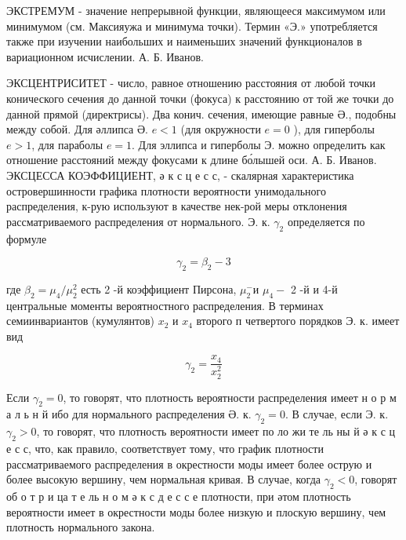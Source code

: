 \documentclass[10pt]{article}
\begin{document}
ЭКСТРЕМУМ - значение непрерывной функции, являющееся максимумом или минимумом (см. Максияужа и минимума точки). Термин «Э.» употребляется также при изучении наибольших и наименьших значений функционалов в вариационном исчислении. А. Б. Иванов.



ЭКСЦЕНТРИСИТЕТ - число, равное отношению расстояния от любой точки конического сечения до данной точки (фокуса) к расстоянию от той же точки до данной прямой (директрисы). Два конич. сечения, имеющие равные Ә., подобны между собой. Для әллипса Ә. $e<1$ (для окружности $e=0$ ), для гиперболы $e>1$, для параболы $e=1$. Для эллипса и гиперболы Э. можно определить как отношение расстояний между фокусами к длине бо́лышей оси. $А$. Б. Иванов. ЭКСЦЕССА КОЭФФИЦИЕНТ, ә к с ц е с с, - скалярная характеристика островершинности графика плотности вероятности унимодального распределения, к-рую используют в качестве нек-рой меры отклонения рассматриваемого распределения от нормального. Э. к. $\gamma_{2}$ определяется по формуле



\[

\gamma_{2}=\beta_{2}-3

\]



где $\beta_{2}=\mu_{4} / \mu_{2}^{2}$ есть 2 -й коэффициент Пирсона, $\mu_{2}^{-}$и $\mu_{4}-$ 2 -й и 4-й центральные моменты вероятностного распределения. В терминах семиинвариантов (кумулянтов) $x_{2}$ и $x_{4}$ второго п четвертого порядков Э. к. имеет вид



\[

\gamma_{2}=\frac{x_{4}}{x_{2}^{2}}

\]



Если $\gamma_{2}=0$, то говорят, что плотность вероятности распределения имеет н о р м а л ь н й ибо для нормального распределения Ә. к. $\gamma_{2}=0$. В случае, если Э. к. $\gamma_{2}>0$, то говорят, что плотность вероятности имеет по ло жи те ль ны й ә к с ц е с с, что, как правило, соответствует тому, что график плотности рассматриваемого распределения в окрестности моды имеет более острую и более высокую вершину, чем нормальная кривая. В случае, когда $\gamma_{2}<0$, говорят об о т р и ца т е ль н о м ә к с д е с с е плотности, при әтом плотность вероятности имеет в окрестности моды более низкую и плоскую вершину, чем плотность нормального закона.
\end{document}
